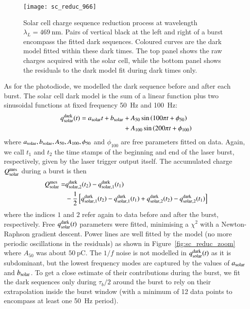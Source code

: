 \begin{figure}[!h]
\centering
\texttt{[image: sc\_reduc\_966]}
\caption{Solar cell charge sequence reduction process at wavelength $\lambda_L=\SI{469}{\nm}$. Pairs of vertical black at the left and right of a burst encompass the fitted dark sequences. Coloured curves are the dark model fitted within these dark times. The top panel shows the raw charges acquired with the solar cell, while the bottom panel shows the residuals to the dark model fit during dark times only.}\label{fig:sc_reduc}
\end{figure}

As for the photodiode, we modelled the dark sequence before and after each burst. The solar cell dark model is the sum of a linear function plus two sinusoidal functions at fixed frequency \SI{50}{\hertz} and \SI{100}{\hertz}:
\begin{align}
    q_{\rm solar}^{\rm dark}(t) = a_{\rm solar}t + b_{\rm solar} & + A_{50} \sin \left( 100 \pi t + \phi_{50}\right)  \notag \\  & +  A_{100} \sin \left( 200 \pi t + \phi_{100}\right)
\end{align}
where $a_{\rm solar}, b_{\rm solar}, A_{50}, A_{100}, \phi_{50}$ and $\phi_{100}$ are free parameters fitted on data. 
Again, we call $t_1$ and $t_2$ the time stamps of the beginning and end of the laser burst, respectively, given by the laser trigger output itself.
The accumulated charge $Q_{\mathrm{solar}}^{\mathrm{mes}}$ during a burst is then
\begin{align}\label{eq:qsolar}
Q_{\mathrm{solar}}^{\mathrm{mes}}  = & q_{\rm solar,2}^{\rm dark}(t_2) - q_{\rm solar, 1}^{\rm dark}(t_1) \\  &  - \frac{1}{2} \left[q_{\rm solar,1}^{\rm dark}(t_2) - q_{\rm solar,1}^{\rm dark}(t_1) + q_{\rm solar,2}^{\rm dark}(t_2) - q_{\rm solar,2}^{\rm dark}(t_1)  \right]    \notag
\end{align}
where the indices $1$ and $2$ refer again to data before and after the burst, respectively.  Free $q_{\rm solar}^{\rm dark}(t)$ parameters were fitted, minimising a $\chi^2$ with a Newton-Raphson gradient descent. Power lines are well fitted by the model (no more periodic oscillations in the residuals) as shown in Figure~\ref{fig:sc_reduc_zoom} where $A_{50}$ was about $\SI{50}{\pico\coulomb}$.
The $1/f$ noise is not modelled in $q_{\rm solar}^{\rm dark}(t)$ as it is subdominant, but the lowest frequency modes are captured by the values of $a_{\rm solar}$ and $b_{\rm solar}$. To get a close estimate of their contributions during the burst, we fit the dark sequences only during $\tau_b/2$ around the burst to rely on their extrapolation inside the burst window (with a minimum of 12 data points to encompass at least one \SI{50}{\hertz} period). %
